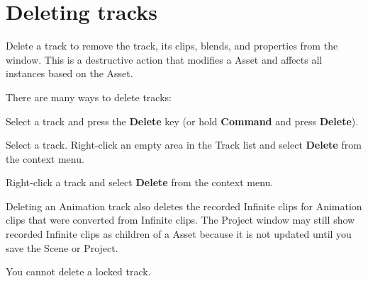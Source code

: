 \chapter{Deleting tracks}
\hypertarget{md__library_2_package_cache_2com_8unity_8timeline_0d1_87_86_2_documentation_0i_2trk__delete}{}\label{md__library_2_package_cache_2com_8unity_8timeline_0d1_87_86_2_documentation_0i_2trk__delete}
\label{md__library_2_package_cache_2com_8unity_8timeline_0d1_87_86_2_documentation_0i_2trk__delete_autotoc_md1257}%
%
 Delete a track to remove the track, its clips, blends, and properties from the  window. This is a destructive action that modifies a  Asset and affects all  instances based on the  Asset.

There are many ways to delete tracks\+:


\begin{DoxyItemize}
\item Select a track and press the {\bfseries{Delete}} key (or hold {\bfseries{Command}} and press {\bfseries{Delete}}).
\item Select a track. Right-\/click an empty area in the Track list and select {\bfseries{Delete}} from the context menu.
\item Right-\/click a track and select {\bfseries{Delete}} from the context menu.
\end{DoxyItemize}

Deleting an Animation track also deletes the recorded Infinite clips for Animation clips that were converted from Infinite clips. The Project window may still show recorded Infinite clips as children of a  Asset because it is not updated until you save the Scene or Project.

You cannot delete a locked track. 